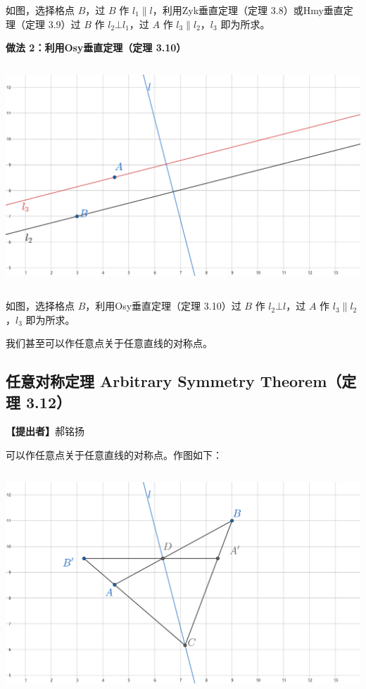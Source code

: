 \documentclass[UTF8]{article}
\begin{document}
如图，选择格点 \(B\)，过 \(B\) 作
\(l_{1} \parallel l\)，利用Zyk垂直定理（定理 3.8）或Hmy垂直定理（定理
3.9）过 \(B\) 作 \(l_{2}\bot l_{1}\)，过 \(A\) 作
\(l_{3} \parallel l_{2}\)，\(l_{3}\) 即为所求。

\textbf{做法 2：利用Osy垂直定理（定理 3.10）}

\includegraphics[width=5.76806in,height=3.27847in]{media/image57.png}

如图，选择格点 \(B\)，利用Osy垂直定理（定理 3.10）过 \(B\) 作
\(l_{2}\bot l\)，过 \(A\) 作 \(l_{3} \parallel l_{2}\)，\(l_{3}\)
即为所求。

我们甚至可以作任意点关于任意直线的对称点。

\hypertarget{ux4efbux610fux5bf9ux79f0ux5b9aux7406-arbitrary-symmetry-theoremux5b9aux7406-3.12}{%
\subsection{任意对称定理 Arbitrary Symmetry Theorem（定理
3.12）}\label{ux4efbux610fux5bf9ux79f0ux5b9aux7406-arbitrary-symmetry-theoremux5b9aux7406-3.12}}

\textbf{【提出者】}郝铭扬

可以作任意点关于任意直线的对称点。作图如下：

\includegraphics[width=5.76806in,height=3.27847in]{media/image58.png}
\end{document}
